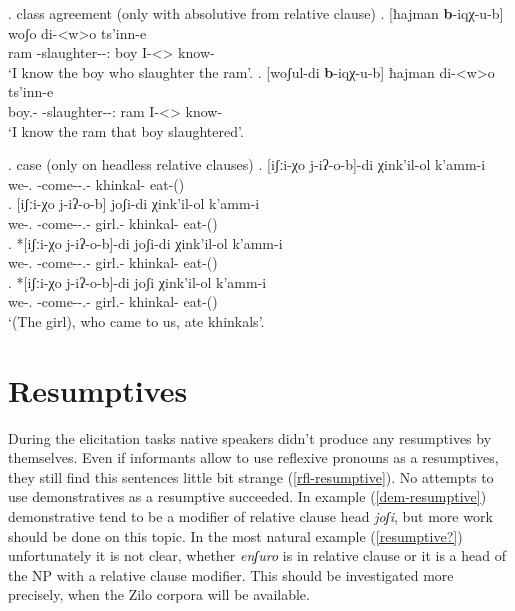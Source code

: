 \ex. class agreement (only with absolutive from relative clause)
	\ag. [ħajman \textbf{b}-iqχ-u-b] woʃo di-<w>o ts'inn-e \\
			ram {\Nanf-slaughter-\Pst-\Ptcp:\Pst} boy {I-<\M>\Aff} {know-\Hab}\\
			\glt `I know the boy who slaughter the ram'.
	\bg. [woʃul-di \textbf{b}-iqχ-u-b] ħajman di-<w>o ts'inn-e \\
			{boy.\Obl-\Erg} {\Nanf-slaughter-\Pst-\Ptcp:\Pst} ram {I-<\M>\Aff} {know-\Hab}\\
			\glt `I know the ram that boy slaughtered'.	
			
\ex. case (only on headless relative clauses)
	\ag. [iʃːi-χo j-iʔ-o-b]-di χink'il-ol k'amm-i\\
			{we-\Add.\Lat} {\M-come-\Pst-\Ptcp.\Pst-\Erg} {khinkal-\Pl} {eat-\Pst(\Aor)}\\
	\bg. [iʃːi-χo j-iʔ-o-b] joʃi-di χink'il-ol k'amm-i\\
			{we-\Add.\Lat} {\M-come-\Pst-\Ptcp.\Pst-\Erg} {girl.\Obl-\Erg} {khinkal-\Pl} {eat-\Pst(\Aor)}\\
	\bg. *[iʃːi-χo j-iʔ-o-b]-di joʃi-di χink'il-ol k'amm-i\\
			{we-\Add.\Lat} {\M-come-\Pst-\Ptcp.\Pst-\Erg} {girl.\Obl-\Erg} {khinkal-\Pl} {eat-\Pst(\Aor)}\\
	\bg. *[iʃːi-χo j-iʔ-o-b]-di joʃi χink'il-ol k'amm-i\\
			{we-\Add.\Lat} {\M-come-\Pst-\Ptcp.\Pst-\Erg} {girl.\Obl-\Erg} {khinkal-\Pl} {eat-\Pst(\Aor)}\\
			\glt `(The girl), who came to us, ate khinkals'.

\section{Resumptives}
During the elicitation tasks native speakers didn't produce any resumptives by themselves. Even if informants allow to use reflexive pronouns as a resumptives, they still find this sentences little bit strange (\ref{rfl-resumptive}). No attempts to use demonstratives as a resumptive succeeded. In example (\ref{dem-resumptive}) demonstrative tend to be a modifier of relative clause head \textit{joʃi}, but more work should be done on this topic. In the most natural example (\ref{resumptive?}) unfortunately it is not clear, whether \textit{enʃuro} is in relative clause or it is a head of the NP with a relative clause modifier. This should be investigated more precisely, when the Zilo corpora will be available.

